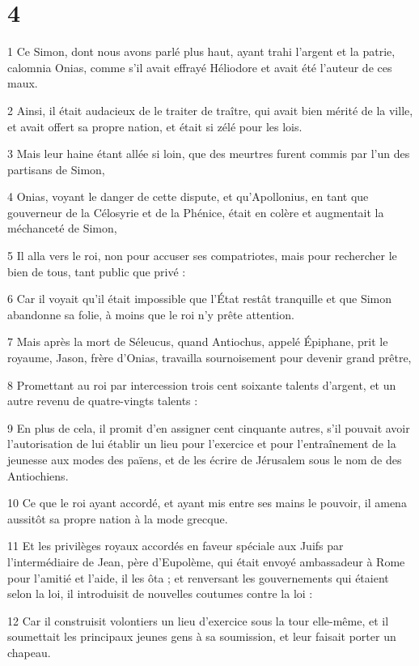 \chapter{4}

\par 1 Ce Simon, dont nous avons parlé plus haut, ayant trahi l'argent et la patrie, calomnia Onias, comme s'il avait effrayé Héliodore et avait été l'auteur de ces maux.
\par 2 Ainsi, il était audacieux de le traiter de traître, qui avait bien mérité de la ville, et avait offert sa propre nation, et était si zélé pour les lois.
\par 3 Mais leur haine étant allée si loin, que des meurtres furent commis par l'un des partisans de Simon,
\par 4 Onias, voyant le danger de cette dispute, et qu'Apollonius, en tant que gouverneur de la Célosyrie et de la Phénice, était en colère et augmentait la méchanceté de Simon,
\par 5 Il alla vers le roi, non pour accuser ses compatriotes, mais pour rechercher le bien de tous, tant public que privé :
\par 6 Car il voyait qu'il était impossible que l'État restât tranquille et que Simon abandonne sa folie, à moins que le roi n'y prête attention.
\par 7 Mais après la mort de Séleucus, quand Antiochus, appelé Épiphane, prit le royaume, Jason, frère d'Onias, travailla sournoisement pour devenir grand prêtre,
\par 8 Promettant au roi par intercession trois cent soixante talents d'argent, et un autre revenu de quatre-vingts talents :
\par 9 En plus de cela, il promit d'en assigner cent cinquante autres, s'il pouvait avoir l'autorisation de lui établir un lieu pour l'exercice et pour l'entraînement de la jeunesse aux modes des païens, et de les écrire de Jérusalem sous le nom de des Antiochiens.
\par 10 Ce que le roi ayant accordé, et ayant mis entre ses mains le pouvoir, il amena aussitôt sa propre nation à la mode grecque.
\par 11 Et les privilèges royaux accordés en faveur spéciale aux Juifs par l'intermédiaire de Jean, père d'Eupolème, qui était envoyé ambassadeur à Rome pour l'amitié et l'aide, il les ôta ; et renversant les gouvernements qui étaient selon la loi, il introduisit de nouvelles coutumes contre la loi :
\par 12 Car il construisit volontiers un lieu d'exercice sous la tour elle-même, et il soumettait les principaux jeunes gens à sa soumission, et leur faisait porter un chapeau.
